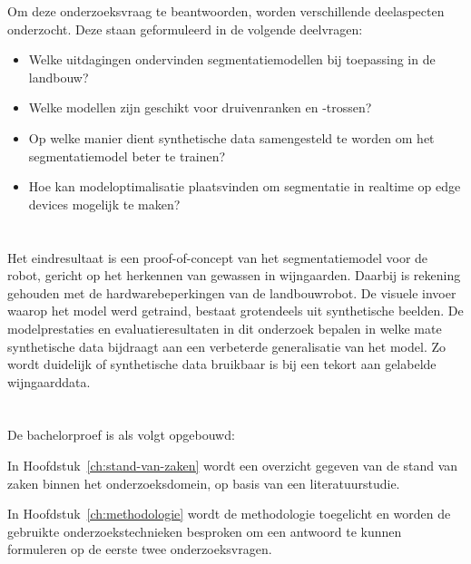 Om deze onderzoeksvraag te beantwoorden, worden verschillende deelaspecten onderzocht. Deze staan geformuleerd in de volgende deelvragen:

\begin{itemize}
    \setlength{\itemsep}{0pt}
    \setlength{\parskip}{0pt}
    \item Welke uitdagingen ondervinden segmentatiemodellen bij toepassing in de landbouw?
    \item Welke modellen zijn geschikt voor druivenranken en -trossen?
    \item Op welke manier dient synthetische data samengesteld te worden om het segmentatiemodel beter te trainen?
    \item Hoe kan modeloptimalisatie plaatsvinden om segmentatie in realtime op edge devices mogelijk te maken?
\end{itemize}

\section{}%
\label{sec:onderzoeksdoelstelling}

Het eindresultaat is een proof-of-concept van het segmentatiemodel voor de robot, gericht op het herkennen van gewassen in wijngaarden. Daarbij is rekening gehouden met de hardwarebeperkingen van de landbouwrobot. De visuele invoer waarop het model werd getraind, bestaat grotendeels uit synthetische beelden. De modelprestaties en evaluatieresultaten in dit onderzoek bepalen in welke mate synthetische data bijdraagt aan een verbeterde generalisatie van het model. Zo wordt duidelijk of synthetische data bruikbaar is bij een tekort aan gelabelde wijngaarddata.

\section{}%
\label{sec:opzet-bachelorproef}

De bachelorproef is als volgt opgebouwd:

In Hoofdstuk~\ref{ch:stand-van-zaken} wordt een overzicht gegeven van de stand van zaken binnen het onderzoeksdomein, op basis van een literatuurstudie.

In Hoofdstuk~\ref{ch:methodologie} wordt de methodologie toegelicht en worden de gebruikte onderzoekstechnieken besproken om een antwoord te kunnen formuleren op de eerste twee onderzoeksvragen.


